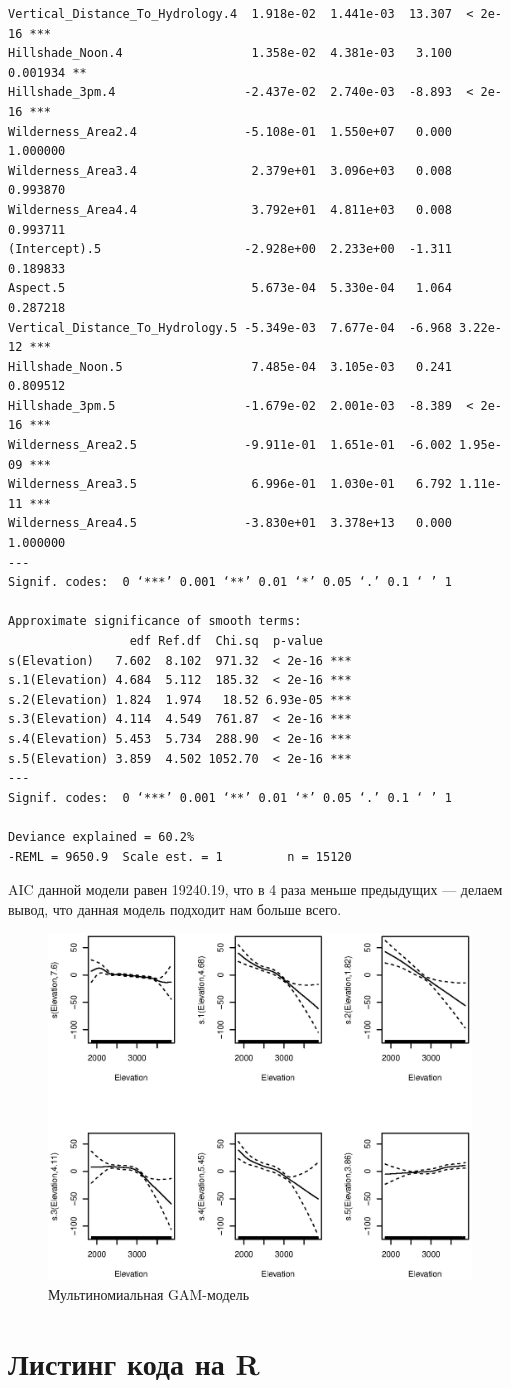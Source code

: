 \documentclass[12pt]{article}
\begin{document}
\begin{verbatim}
Vertical_Distance_To_Hydrology.4  1.918e-02  1.441e-03  13.307  < 2e-16 ***
Hillshade_Noon.4                  1.358e-02  4.381e-03   3.100 0.001934 **
Hillshade_3pm.4                  -2.437e-02  2.740e-03  -8.893  < 2e-16 ***
Wilderness_Area2.4               -5.108e-01  1.550e+07   0.000 1.000000
Wilderness_Area3.4                2.379e+01  3.096e+03   0.008 0.993870
Wilderness_Area4.4                3.792e+01  4.811e+03   0.008 0.993711
(Intercept).5                    -2.928e+00  2.233e+00  -1.311 0.189833
Aspect.5                          5.673e-04  5.330e-04   1.064 0.287218
Vertical_Distance_To_Hydrology.5 -5.349e-03  7.677e-04  -6.968 3.22e-12 ***
Hillshade_Noon.5                  7.485e-04  3.105e-03   0.241 0.809512
Hillshade_3pm.5                  -1.679e-02  2.001e-03  -8.389  < 2e-16 ***
Wilderness_Area2.5               -9.911e-01  1.651e-01  -6.002 1.95e-09 ***
Wilderness_Area3.5                6.996e-01  1.030e-01   6.792 1.11e-11 ***
Wilderness_Area4.5               -3.830e+01  3.378e+13   0.000 1.000000
---
Signif. codes:  0 ‘***’ 0.001 ‘**’ 0.01 ‘*’ 0.05 ‘.’ 0.1 ‘ ’ 1

Approximate significance of smooth terms:
                 edf Ref.df  Chi.sq  p-value
s(Elevation)   7.602  8.102  971.32  < 2e-16 ***
s.1(Elevation) 4.684  5.112  185.32  < 2e-16 ***
s.2(Elevation) 1.824  1.974   18.52 6.93e-05 ***
s.3(Elevation) 4.114  4.549  761.87  < 2e-16 ***
s.4(Elevation) 5.453  5.734  288.90  < 2e-16 ***
s.5(Elevation) 3.859  4.502 1052.70  < 2e-16 ***
---
Signif. codes:  0 ‘***’ 0.001 ‘**’ 0.01 ‘*’ 0.05 ‘.’ 0.1 ‘ ’ 1

Deviance explained = 60.2%
-REML = 9650.9  Scale est. = 1         n = 15120
\end{verbatim}

AIC данной модели равен 19240.19, что в 4 раза меньше предыдущих --- делаем
вывод, что данная модель подходит нам больше всего.
\begin{figure}
\includegraphics{gam2}
\caption{Мультиномиальная GAM-модель}
\end{figure}
\newpage
\section{Листинг кода на R}

\end{document}
